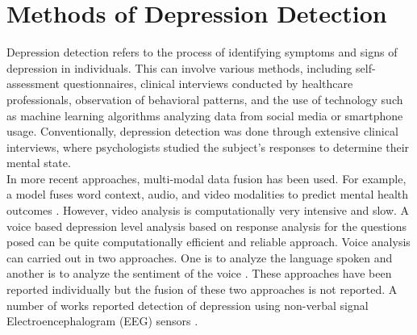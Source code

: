 \section{Methods of Depression Detection}
Depression detection refers to the process of identifying symptoms and signs of depression in individuals. This can involve various methods, including self-assessment questionnaires, clinical interviews conducted by healthcare professionals, observation of behavioral patterns, and the use of technology such as machine learning algorithms \cite{mahesh2020machine} analyzing data from social media or smartphone usage. Conventionally, depression detection was done through extensive clinical interviews, where psychologists studied the subject’s responses to determine their mental state\cite{islam2018depression}.
\\
In more recent approaches, multi-modal data fusion has been used. For example, a model fuses word context, audio, and video modalities to predict mental health outcomes \cite{shoumy2020multimodal,jan2017artificial}. However, video analysis is computationally very intensive and slow. A voice based depression level analysis based on response analysis for the questions posed can be quite computationally efficient and reliable approach. Voice analysis can carried out in two approaches. One is to analyze the language spoken \cite{koops2023speech} and another is to analyze the sentiment of the voice \cite{tokuno2018pathophysiological}. These approaches have been reported individually but the fusion of these two approaches is not reported.
A number of works reported detection of depression using non-verbal signal Electroencephalogram (EEG) sensors \cite{yasin2023machine,sarma2020review}.


